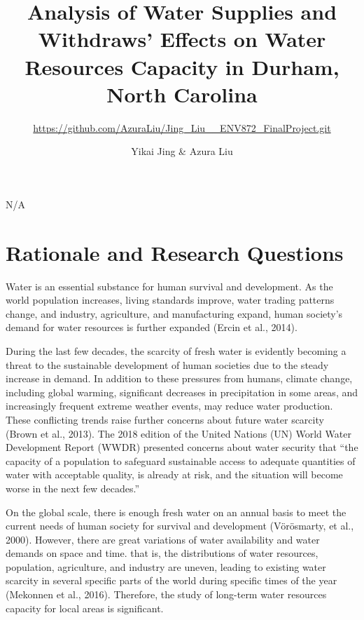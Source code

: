 \documentclass[
  12pt,
]{article}
\title{Analysis of Water Supplies and Withdraws' Effects on Water
Resources Capacity in Durham, North Carolina}
\subtitle{\url{https://github.com/AzuraLiu/Jing_Liu__ENV872_FinalProject.git}}
\author{Yikai Jing \& Azura Liu}
\date{}
\begin{document}
\maketitle

\newpage
\tableofcontents

\newpage
\listoftables

N/A

\listoffigures

\newpage

\hypertarget{rationale-and-research-questions}{%
\section{Rationale and Research
Questions}\label{rationale-and-research-questions}}

Water is an essential substance for human survival and development. As
the world population increases, living standards improve, water trading
patterns change, and industry, agriculture, and manufacturing expand,
human society's demand for water resources is further expanded (Ercin et
al., 2014).

During the last few decades, the scarcity of fresh water is evidently
becoming a threat to the sustainable development of human societies due
to the steady increase in demand. In addition to these pressures from
humans, climate change, including global warming, significant decreases
in precipitation in some areas, and increasingly frequent extreme
weather events, may reduce water production. These conflicting trends
raise further concerns about future water scarcity (Brown et al., 2013).
The 2018 edition of the United Nations (UN) World Water Development
Report (WWDR) presented concerns about water security that ``the
capacity of a population to safeguard sustainable access to adequate
quantities of water with acceptable quality, is already at risk, and the
situation will become worse in the next few decades.''

On the global scale, there is enough fresh water on an annual basis to
meet the current needs of human society for survival and development
(Vörösmarty, et al., 2000). However, there are great variations of water
availability and water demands on space and time. that is, the
distributions of water resources, population, agriculture, and industry
are uneven, leading to existing water scarcity in several specific parts
of the world during specific times of the year (Mekonnen et al., 2016).
Therefore, the study of long-term water resources capacity for local
areas is significant.
\end{document}
